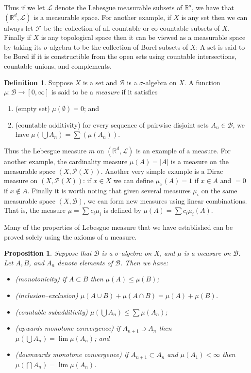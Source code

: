 \documentclass[10pt,oneside]{amsbook}
\newcommand{\RR}{{\mathbb R}}
\theoremstyle{definition}
\theoremstyle{plain}
\newtheorem{prop}[thm]{Proposition}
\theoremstyle{definition}
\newtheorem{defn}[thm]{Definition}
\theoremstyle{remark}
\numberwithin{equation}{section}
\numberwithin{figure}{section}
\begin{document}
Thus if we let $\mathcal L$ denote the Lebesgue measurable subsets of $\RR^d$, we have that $(\RR^d,\mathcal L)$ is a measurable space. For another example, if $X$ is any set then we can always let $\mathcal F$ be the collection of all countable or co-countable subsets of $X$. Finally if $X$ is any topological space then it can be viewed as a measurable space by taking its $\sigma$-algebra to be the collection of Borel subsets of $X$: A set is said to be Borel if it is constructible from the open sets using countable intersections, countable unions, and complements.

\begin{defn}
  Suppose $X$ is a set and $\mathcal B$ is a $\sigma$-algebra on $X$. A function $\mu\colon\mathcal B\to[0,\infty]$ is said to be a \emph{measure} if it satisfies
  \begin{enumerate}
  \item (empty set) $\mu(\emptyset)=0$; and
  \item (countable additivity) for every sequence of pairwise disjoint sets $A_n\in\mathcal B$, we have $\mu(\bigcup A_n)=\sum(\mu(A_n))$.
  \end{enumerate}
\end{defn}

Thus the Lebesgue measure $m$ on $(\RR^d,\mathcal L)$ is an example of a measure. For another example, the cardinality measure $\mu(A)=|A|$ is a measure on the measurable space $(X,\mathcal P(X))$. Another very simple example is a Dirac measure on $(X,\mathcal P(X))$: if $x\in X$ we can define $\mu_x(A)=1$ if $x\in A$ and $=0$ if $x\notin A$. Finally it is worth noting that given several measures $\mu_i$ on the same measurable space $(X,\mathcal B)$, we can form new measures using linear combinations. That is, the measure $\mu=\sum c_i\mu_i$ is defined by $\mu(A)=\sum c_i\mu_i(A)$.

Many of the properties of Lebesgue measure that we have established can be proved solely using the axioms of a measure.

\begin{prop}
  Suppose that $\mathcal B$ is a $\sigma$-algebra on $X$, and $\mu$ is a measure on $\mathcal B$. Let $A,B$, and $A_n$ denote elements of $\mathcal B$. Then we have:
  \begin{itemize}
    \item (monotonicity) if $A\subset B$ then $\mu(A)\leq\mu(B)$;
    \item (inclusion--exclusion) $\mu(A\cup B)+\mu(A\cap B)=\mu(A)+\mu(B)$.
    \item (countable subadditivity) $\mu(\bigcup A_n)\leq\sum\mu(A_n)$;
    \item (upwards monotone convergence) if $A_{n+1}\supset A_n$ then $\mu(\bigcup A_n)=\lim\mu(A_n)$; and
    \item (downwards monotone convergence) if $A_{n+1}\subset A_n$ and $\mu(A_1)<\infty$ then $\mu(\bigcap A_n)=\lim\mu(A_n)$.
  \end{itemize}
\end{prop}
\end{document}
